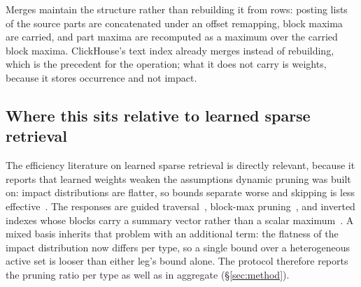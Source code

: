 Merges maintain the structure rather than rebuilding it from rows: posting
lists of the source parts are concatenated under an offset remapping, block
maxima are carried, and part maxima are recomputed as a maximum over the
carried block maxima. ClickHouse's text index already merges instead of
rebuilding, which is the precedent for the operation; what it does not carry is
weights, because it stores occurrence and not impact.

\subsection{Where this sits relative to learned sparse retrieval}

\prior{} The efficiency literature on learned sparse retrieval is directly
relevant, because it reports that learned weights weaken the assumptions
dynamic pruning was built on: impact distributions are flatter, so bounds
separate worse and skipping is less
effective~\cite{mackenzie2021wacky,lassance2022efficiency}. The responses are
guided traversal~\cite{mallia2022guided}, block-max
pruning~\cite{mallia2024bmp}, and inverted indexes whose blocks carry a summary
vector rather than a scalar maximum~\cite{bruch2024seismic}. A mixed basis
inherits that problem with an additional term: the flatness of the impact
distribution now differs per type, so a single bound over a heterogeneous
active set is looser than either leg's bound alone. The protocol therefore
reports the pruning ratio per type as well as in aggregate
(\S\ref{sec:method}).
